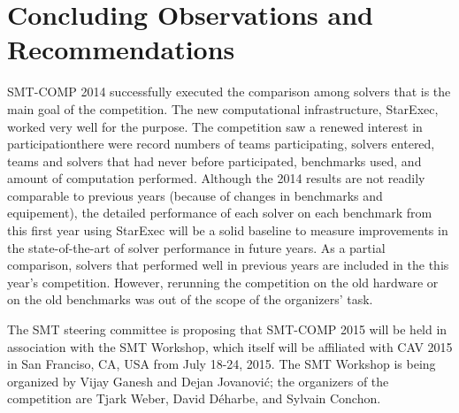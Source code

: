\documentclass[twoside,11pt]{article}
\begin{document}
\section{Concluding Observations and Recommendations}
\label{sec:conclusions}

SMT-COMP 2014 successfully executed the comparison among solvers that is the main goal
of the competition. The new computational infrastructure, StarExec, worked very well for the purpose. The competition saw a renewed interest in participation\textemdash there were record numbers of teams participating, solvers entered, teams and solvers that had never before participated, benchmarks used, and amount of computation performed. Although the 2014 results are not readily comparable to previous years (because of changes in benchmarks and equipement), the detailed performance of each solver on each benchmark from this first year using StarExec will be a solid baseline to measure improvements in the state-of-the-art of solver performance in future years. As a partial comparison, solvers that performed well in previous years are included in the this year's competition. However, rerunning the competition on the old hardware or on the old benchmarks was out of the scope of the organizers' task.



The SMT steering committee is proposing that SMT-COMP 2015 will be held in association with the SMT Workshop, which itself will be affiliated with CAV 2015 in San Franciso, CA, USA from July 18-24, 2015.
The SMT Workshop is being organized by
Vijay Ganesh and
Dejan Jovanovi\'c; the organizers of the competition are Tjark Weber, David D\'eharbe, and Sylvain Conchon.
\end{document}

